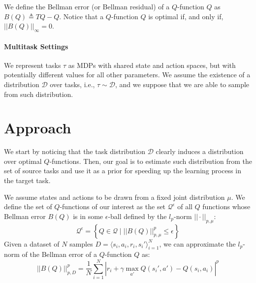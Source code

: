 \documentclass{article}
\begin{document}
We define the Bellman error (or Bellman residual) of a $Q$-function $Q$ as $B(Q) \triangleq TQ - Q$. Notice that a $Q$-function $Q$ is optimal if, and only if, $||B(Q)||_{\infty} = 0$.

\paragraph{Multitask Settings}

We represent tasks $\tau$ as MDPs with shared state and action spaces, but with potentially different values for all other parameters. We assume the existence of a distribution $\mathcal{D}$ over tasks, i.e., $\tau \sim \mathcal{D}$, and we suppose that we are able to sample from such distribution.

\section{Approach}

We start by noticing that the task distribution $\mathcal{D}$ clearly induces a distribution over optimal $Q$-functions. Then, our goal is to estimate such distribution from the set of source tasks and use it as a prior for speeding up the learning process in the target task.

We assume states and actions to be drawn from a fixed joint distribution $\mu$. We define the set of $Q$-functions of our interest as the set $\mathcal{Q}^{\epsilon}$ of all $Q$ functions whose Bellman error $B(Q)$ is in some $\epsilon$-ball defined by the $l_p$-norm $|| \cdot ||_{p,\mu}$:
\begin{equation}
\mathcal{Q}^{\epsilon} = \left\{ Q\in\mathcal{Q} \mid || B(Q) ||_{p,\mu}^p \leq \epsilon \right\}
\end{equation}
Given a dataset of $N$ samples $D = \langle s_i,a_i,r_i,s_i' \rangle_{i=1}^N$, we can approximate the $l_p$-norm of the Bellman error of a $Q$-function $Q$ as:
\begin{equation}
||B(Q)||_{p,D}^p = \frac{1}{N}\sum_{i=1}^N \left\lvert r_i + \gamma\max_{a'}Q(s_i',a') - Q(s_i,a_i) \right\rvert^p
\end{equation}
\end{document}
